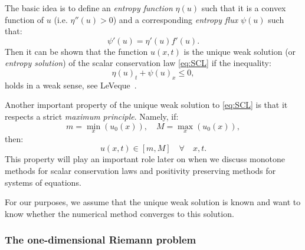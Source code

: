 The basic idea is to define an \textit{entropy function} $ \eta(u) $ such that it is a convex function of $ u $ (i.e. $ \eta''(u) > 0 $) and a corresponding \textit{entropy flux} $ \psi(u) $ such that:
\begin{equation}
\psi'(u) = \eta'(u) f'(u).
\end{equation}
Then it can be shown that the function $ u(x,t) $ is the unique weak solution (or \textit{entropy solution}) of the scalar conservation law \eqref{eq:SCL} if the inequality:
\begin{equation} \label{eq:SCL-entropy-inequality}
\eta(u)_t + \psi(u)_x \leq 0,
\end{equation}
holds in a weak sense, see LeVeque~\cite[p.~39]{lev92}.

Another important property of the unique weak solution to \eqref{eq:SCL} is that it respects a strict \textit{maximum principle}. Namely, if:
\begin{equation}
m = \underset{x}{\min} \left( u_0(x) \right), \quad
M = \underset{x}{\max} \left( u_0(x) \right),
\end{equation}
then:
\begin{equation} \label{eq:PDE-maximum}
u(x,t) \in [m,M] \quad \forall \quad x,t.
\end{equation} 
This property will play an important role later on when we discuss monotone methods for scalar conservation laws and positivity preserving methods for systems of equations.

For our purposes, we assume that the unique weak solution is known and want to know whether the numerical method converges to this solution.

\subsubsection{The one-dimensional Riemann problem}

